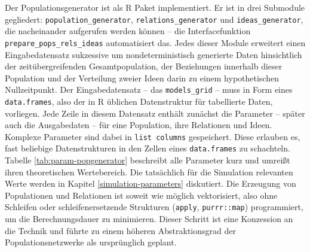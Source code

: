 \documentclass[openany,twoside,twocolumn]{book}
\begin{document}
Der Populationsgenerator ist als R Paket implementiert. Er ist in drei
Submodule gegliedert: \texttt{population\_generator},
\texttt{relations\_generator} und \texttt{ideas\_generator}, die
nacheinander aufgerufen werden können -- die Interfacefunktion
\texttt{prepare\_pops\_rels\_ideas} automatisiert das. Jedes dieser
Module erweitert einen Eingabedatensatz sukzessive um nondeterministisch
generierte Daten hinsichtlich der zeitübergreifenden Gesamtpopulation,
der Beziehungen innerhalb dieser Population und der Verteilung zweier
Ideen darin zu einem hypothetischen Nullzeitpunkt. Der Eingabedatensatz
-- das \texttt{models\_grid} -- muss in Form eines \texttt{data.frames},
also der in R üblichen Datenstruktur für tabellierte Daten, vorliegen.
Jede Zeile in diesem Datensatz enthält zunächst die Parameter -- später
auch die Ausgabedaten -- für eine Population, ihre Relationen und Ideen.
Komplexe Parameter sind dabei in \texttt{list\ columns} gespeichert.
Diese erlauben es, fast beliebige Datenstrukturen in den Zellen eines
\texttt{data.frames} zu schachteln. Tabelle \ref{tab:param-popgenerator}
beschreibt alle Parameter kurz und umreißt ihren theoretischen
Wertebereich. Die tatsächlich für die Simulation relevanten Werte werden
in Kapitel \ref{simulation-parameters} diskutiert. Die Erzeugung von
Populationen und Relationen ist soweit wie möglich vektorisiert, also
ohne Schleifen oder schleifenersetzende Strukturen (\texttt{apply},
\texttt{purrr::map}) programmiert, um die Berechnungsdauer zu
minimieren. Dieser Schritt ist eine Konzession an die Technik und führte
zu einem höheren Abstraktionsgrad der Populationsnetzwerke als
ursprünglich geplant.
\end{document}
